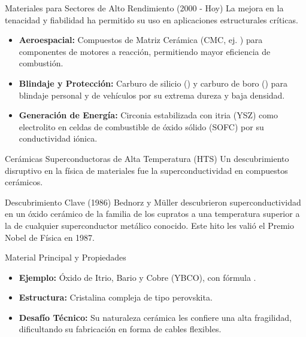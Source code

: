\begin{frame}{Materiales para Sectores de Alto Rendimiento (2000 - Hoy)}
  La mejora en la tenacidad y fiabilidad ha permitido su uso en aplicaciones
  estructurales críticas.

  \begin{itemize}[<+->]
    \item \textbf{Aeroespacial:} Compuestos de Matriz Cerámica (CMC, ej. )
      para componentes de motores a reacción, permitiendo mayor eficiencia de
      combustión.
      \vspace{0.5cm}
    \item \textbf{Blindaje y Protección:} Carburo de silicio () y carburo
      de boro () para blindaje personal y de vehículos por su extrema
      dureza y baja densidad.
      \vspace{0.5cm}
    \item \textbf{Generación de Energía:} Circonia estabilizada con itria (YSZ)
      como electrolito en celdas de combustible de óxido sólido (SOFC) por su
      conductividad iónica.
  \end{itemize}
\end{frame}

\begin{frame}{Cerámicas Superconductoras de Alta Temperatura (HTS)}
  Un descubrimiento disruptivo en la física de materiales fue la
  superconductividad en compuestos cerámicos.

  \pause

  \begin{block}{Descubrimiento Clave (1986)}
    Bednorz y Müller descubrieron superconductividad en un óxido cerámico de la
    familia de los cupratos a una temperatura superior a la de cualquier
    superconductor metálico conocido. Este hito les valió el \alert{Premio
    Nobel} de
    Física en 1987.
  \end{block}

  \pause

  \begin{block}{Material Principal y Propiedades}
    \begin{itemize}[<+->]
      \item \textbf{Ejemplo:} Óxido de Itrio, Bario y Cobre (YBCO), con fórmula
        .
      \item \textbf{Estructura:} Cristalina compleja de tipo perovskita.
      \item \textbf{Desafío Técnico:} Su naturaleza cerámica les confiere una
        alta fragilidad, dificultando su fabricación en forma de cables
        flexibles.
    \end{itemize}
  \end{block}
\end{frame}

